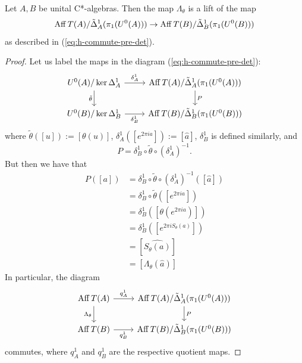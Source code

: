 \documentclass[12pt]{amsart}
\begin{document}
\begin{prop}\label{prop:S-theta-is-a-lift}
Let $A,B$ be unital C*-algebras. Then the map $\Lambda_\theta$ is a lift of the map
\begin{equation}
\operatorname{Aff} T(A)/\tilde{\Delta}_A^1(\pi_1(U^0(A))) \to \operatorname{Aff} T(B)/\tilde{\Delta}_B^1(\pi_1(U^0(B)))
\end{equation}
as described in (\ref{eq:h-commute-pre-det}).
\begin{proof}
Let us label the maps in the diagram (\ref{eq:h-commute-pre-det}):
\begin{equation}
\begin{tikzcd}
U^0(A)/\ker \Delta^1_A \arrow[d, "\tilde\theta"'] \arrow[r, "\delta_A^1"] & \Aff T(A)/\tD_A^1(\pi_1(U^0(A))) \arrow[d, "P"] \\
U^0(B)/\ker \Delta^1_B \arrow[r, "\delta_B^1"']                      & \Aff T(B)/\tD_B^1(\pi_1(U^0(B)))                           
\end{tikzcd}
\end{equation}
where $\tilde\theta([u]) := [\theta(u)]$, $\delta_A^1([e^{2\pi i a}]) := [\hat{a}]$, $\delta_B^1$ is defined similarly, and
\begin{equation}
P = \delta_B^1 \circ \tilde\theta \circ (\delta_A^1)^{-1}.
\end{equation}
But then we have that
\begin{equation}
\begin{split}
P([a]) &= \delta_B^1 \circ \tilde\theta \circ (\delta_A^1)^{-1}([\hat{a}]) \\
&= \delta_B^1 \circ \tilde\theta([e^{2\pi i a}]) \\
&= \delta_B^1([\theta(e^{2\pi i a})]) \\
&= \delta_B^1([e^{2\pi i S_\theta(a)}]) \\
&= [\widehat{S_\theta(a)}] \\
&= [\Lambda_\theta(\widehat{a})]
\end{split}
\end{equation}
In particular, the diagram
\begin{equation}
\begin{tikzcd}
\Aff T(A) \arrow[d, "\Lambda_\theta"'] \arrow[r, "q_A^1"] & \Aff T(A)/\tD_A^1(\pi_1(U^0(A))) \arrow[d, "P"] \\
\Aff T(B) \arrow[r, "q_B^1"']                         & \Aff T(B)/\tD_B^1(\pi_1(U^0(B)))               
\end{tikzcd}
\end{equation}
commutes, where $q_A^1$ and $q_B^1$ are the respective quotient maps. 
\end{proof}
\end{prop}
\end{document}

